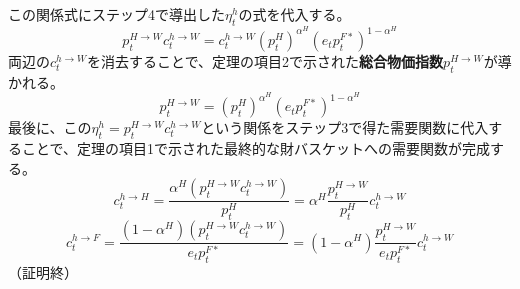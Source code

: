 この関係式にステップ4で導出した\(\eta_t^h\)の式を代入する。
\begin{equation}
p_t^{H\to W}c_t^{h\to W}=c_t^{h\to W}(p_t^H)^{\alpha^H}(e_tp_t^{F*})^{1-\alpha^H}
\label{eq:appendix_cpi_derivation_sub5_equivalence}
\end{equation}
両辺の\(c_t^{h\to W}\)を消去することで、定理の項目2で示された\textbf{総合物価指数\(p_t^{H\to W}\)}が導かれる。
\begin{equation}
p_t^{H\to W}=(p_t^H)^{\alpha^H}(e_tp_t^{F*})^{1-\alpha^H}
\label{eq:appendix_cpi_derivation_sub5_cpi_final}
\end{equation}
最後に、この\(\eta_t^h=p_t^{H\to W}c_t^{h\to W}\)という関係をステップ3で得た需要関数に代入することで、定理の項目1で示された最終的な財バスケットへの需要関数が完成する。
\begin{equation}
c_t^{h\to H}=\frac{\alpha^H(p_t^{H\to W}c_t^{h\to W})}{p_t^H}=\alpha^H\frac{p_t^{H\to W}}{p_t^H}c_t^{h\to W}
\label{eq:appendix_cpi_derivation_sub5_demand_domestic_final}
\end{equation}
\begin{equation}
c_t^{h\to F}=\frac{(1-\alpha^H)(p_t^{H\to W}c_t^{h\to W})}{e_tp_t^{F*}}=(1-\alpha^H)\frac{p_t^{H\to W}}{e_tp_t^{F*}}c_t^{h\to W}
\label{eq:appendix_cpi_derivation_sub5_demand_foreign_final}
\end{equation}
（証明終）
